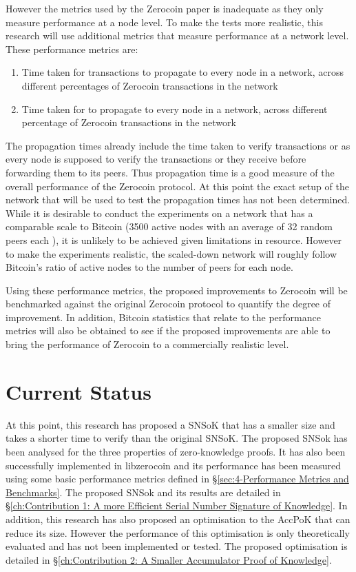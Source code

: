 However the metrics used by the Zerocoin paper is inadequate as they only measure performance at a node level. To make the tests more realistic, this research will use additional metrics that measure performance at a network level. These performance metrics are:

\begin{enumerate}
	\item Time taken for transactions to propagate to every node in a network, across different percentages of Zerocoin transactions in the network
	\item Time taken for  to propagate to every node in a network, across different percentage of Zerocoin transactions in the network
\end{enumerate}

The propagation times already include the time taken to verify transactions or \kwBlock{} as every node is supposed to verify the transactions or  they receive before forwarding them to its peers. Thus propagation time is a good measure of the overall performance of the Zerocoin protocol. At this point the exact setup of the network that will be used to test the propagation times has not been determined. While it is desirable to conduct the experiments on a network that has a comparable scale to Bitcoin (3500 active nodes with an average of 32 random peers each \cite{Decker2013}), it is unlikely to be achieved given limitations in resource.  However to make the experiments realistic, the scaled-down network will roughly follow Bitcoin’s ratio of active nodes to the number of peers for each node.  

Using these performance metrics, the proposed improvements to Zerocoin will be benchmarked against the original Zerocoin protocol to quantify the degree of improvement. In addition, Bitcoin statistics that relate to the performance metrics will also be obtained to see if the proposed improvements are able to bring the performance of Zerocoin to a commercially realistic level.

\section{Current Status}
\label{sec:4-Contribution of Research Current Status}
At this point, this research has proposed a SNSoK that has a smaller size and takes a shorter time to verify than the original SNSoK. The proposed SNSok has been analysed for the three properties of zero-knowledge proofs. It has also been successfully implemented in libzerocoin and its performance has been measured using some basic performance metrics defined in \S\ref{sec:4-Performance Metrics and Benchmarks}. The proposed SNSok and its results are detailed in \S\ref{ch:Contribution 1: A more Efficient Serial Number Signature of Knowledge}.
In addition, this research has also proposed an optimisation to the AccPoK that can reduce its size. However the performance of this optimisation is only theoretically evaluated and has not been implemented or tested. The proposed optimisation is detailed in \S\ref{ch:Contribution 2: A Smaller Accumulator Proof of Knowledge}.
